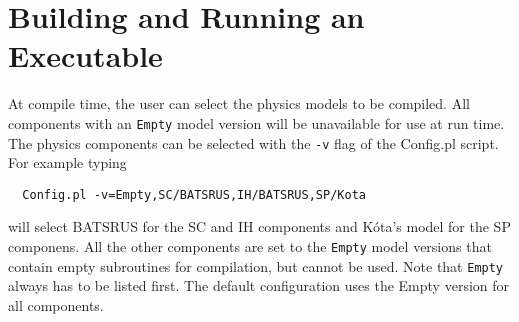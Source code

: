 \section{Building and Running an Executable}

At compile time, the user can select the physics models to be
compiled.  All components with an {\tt Empty} model version will be 
unavailable for use at run time.  
The physics components can be selected with the {\tt -v} flag
of the Config.pl script. For example typing
\begin{verbatim}
  Config.pl -v=Empty,SC/BATSRUS,IH/BATSRUS,SP/Kota
\end{verbatim}
will select BATSRUS for the SC and IH components and K\'ota's model for
the SP componens. All the other components are set to 
the {\tt Empty} model versions that contain empty subroutines for compilation, 
but cannot be used. Note that {\tt Empty} always has to be listed first.
The default configuration uses the Empty version for all components.

